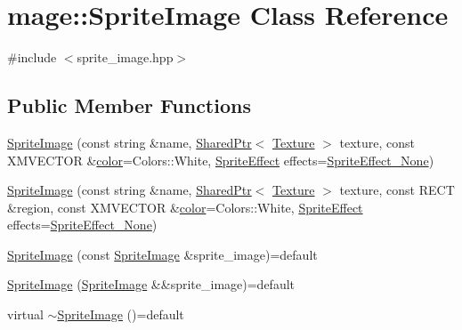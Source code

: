 \hypertarget{classmage_1_1_sprite_image}{}\section{mage\+:\+:Sprite\+Image Class Reference}
\label{classmage_1_1_sprite_image}


{\ttfamily \#include $<$sprite\+\_\+image.\+hpp$>$}

\subsection*{Public Member Functions}
\begin{DoxyCompactItemize}
\item 
\hyperlink{classmage_1_1_sprite_image_a0b18feb55a4a9c2c8ac5fad2a3fbf1cb}{Sprite\+Image} (const string \&name, \hyperlink{namespacemage_a1e01ae66713838a7a67d30e44c67703e}{Shared\+Ptr}$<$ \hyperlink{classmage_1_1_texture}{Texture} $>$ texture, const X\+M\+V\+E\+C\+T\+OR \&\hyperlink{namespacemage_a56eceea5a9bceb2b56073f3ea4945781}{color}=Colors\+::\+White, \hyperlink{namespacemage_a9cfe18123066ba4236f548f9de75d881}{Sprite\+Effect} effects=\hyperlink{namespacemage_a9cfe18123066ba4236f548f9de75d881af3c275fbfacfe174da928b2f24dfa515}{Sprite\+Effect\+\_\+\+None})
\item 
\hyperlink{classmage_1_1_sprite_image_a189d4bc37642c13805f0efc1423d02c1}{Sprite\+Image} (const string \&name, \hyperlink{namespacemage_a1e01ae66713838a7a67d30e44c67703e}{Shared\+Ptr}$<$ \hyperlink{classmage_1_1_texture}{Texture} $>$ texture, const R\+E\+CT \&region, const X\+M\+V\+E\+C\+T\+OR \&\hyperlink{namespacemage_a56eceea5a9bceb2b56073f3ea4945781}{color}=Colors\+::\+White, \hyperlink{namespacemage_a9cfe18123066ba4236f548f9de75d881}{Sprite\+Effect} effects=\hyperlink{namespacemage_a9cfe18123066ba4236f548f9de75d881af3c275fbfacfe174da928b2f24dfa515}{Sprite\+Effect\+\_\+\+None})
\item 
\hyperlink{classmage_1_1_sprite_image_a7270677b4960320d3cf43cd8c4a0ed36}{Sprite\+Image} (const \hyperlink{classmage_1_1_sprite_image}{Sprite\+Image} \&sprite\+\_\+image)=default
\item 
\hyperlink{classmage_1_1_sprite_image_aa8e053469bd4032560c315e9f2a7c14b}{Sprite\+Image} (\hyperlink{classmage_1_1_sprite_image}{Sprite\+Image} \&\&sprite\+\_\+image)=default
\item 
virtual \hyperlink{classmage_1_1_sprite_image_ac5e53addd73b174c6b23d3f0d63260c1}{$\sim$\+Sprite\+Image} ()=default
\item 

\end{DoxyCompactItemize}
